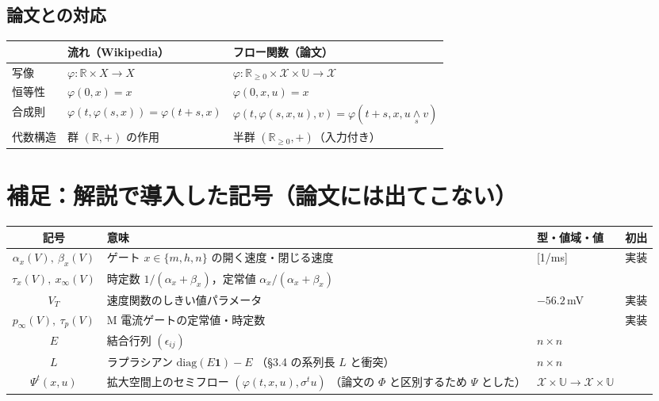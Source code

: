 \documentclass[a4paper,10pt]{ltjsarticle}
\newcommand{\cat}[2]{u\mathbin{\underset{#1}{\wedge}}#2}
\newcommand{\note}[1]{\textcolor{red!70!black}{#1}}
\newenvironment{symtab}{%
  \par\noindent\begin{tabular}{SMTP}
  \toprule
  記号 & 意味 & 型・値域・値 & 初出 \\
  \midrule
}{\bottomrule\end{tabular}\par\medskip}
\begin{document}
\subsection*{論文との対応}
\begin{center}
\begin{tabular}{lll}
\toprule
 & 流れ（Wikipedia） & フロー関数（論文） \\
\midrule
写像 & $\varphi:\mathbb{R}\times X\to X$ & $\varphi:\mathbb{R}_{\ge0}\times\mathcal{X}\times\mathbb{U}\to\mathcal{X}$ \\
恒等性 & $\varphi(0,x)=x$ & $\varphi(0,x,u)=x$ \\
合成則 & $\varphi(t,\varphi(s,x))=\varphi(t+s,x)$ & $\varphi(t,\varphi(s,x,u),v)=\varphi(t+s,x,\cat{s}{v})$ \\
代数構造 & 群 $(\mathbb{R},+)$ の作用 & 半群 $(\mathbb{R}_{\ge0},+)$（入力付き） \\
\bottomrule
\end{tabular}
\end{center}

\section{補足：解説で導入した記号（論文には出てこない）}
\begin{symtab}
$\alpha_x(V),\ \beta_x(V)$ & ゲート $x\in\{m,h,n\}$ の開く速度・閉じる速度 & [1/ms] & 実装 \\
$\tau_x(V),\ x_\infty(V)$ & 時定数 $1/(\alpha_x+\beta_x)$，定常値 $\alpha_x/(\alpha_x+\beta_x)$ & & \\
$V_T$ & 速度関数のしきい値パラメータ & $-56.2$\,mV & 実装 \\
$p_\infty(V),\ \tau_p(V)$ & M 電流ゲートの定常値・時定数 & & 実装 \\
$E$ & 結合行列 $(\epsilon_{ij})$ & $n\times n$ & \\
$L$ & ラプラシアン $\mathrm{diag}(E\mathbf 1)-E$ \note{（§3.4 の系列長 $L$ と衝突）} & $n\times n$ & \\
$\Psi^t(x,u)$ & 拡大空間上のセミフロー $(\varphi(t,x,u),\sigma^t u)$ \note{（論文の $\Phi$ と区別するため $\Psi$ とした）} & $\mathcal{X}\times\mathbb{U}\to\mathcal{X}\times\mathbb{U}$ & \\
\end{symtab}

\end{document}
